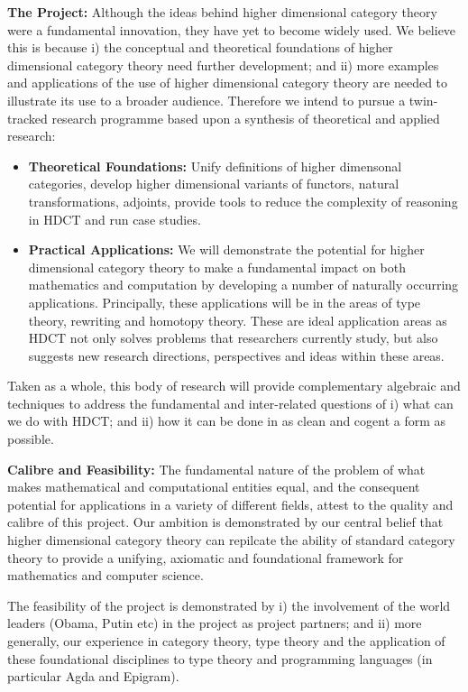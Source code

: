 \documentclass[a4paper,10pt]{article}
\begin{document}
{\bf The Project:} Although the ideas behind higher dimensional
category theory were a fundamental innovation, they have yet to become
widely used. We believe this is because i) the conceptual and
theoretical foundations of higher dimensional category theory need
further development; and ii) more examples and applications of the use
of higher dimensional category theory are needed to illustrate its use
to a broader audience. Therefore we intend to pursue a twin-tracked
research programme based upon a synthesis of theoretical and applied
research:
\begin{itemize}
\item {\bf Theoretical Foundations:} Unify definitions of higher
  dimensonal categories, develop higher dimensional variants of
  functors, natural transformations, adjoints, provide tools to reduce
  the complexity of reasoning in HDCT and run case studies.
\item {\bf Practical Applications:} We will demonstrate the potential
  for higher dimensional category theory to make a fundamental impact
  on both mathematics and computation by developing a number of naturally
  occurring applications. Principally, these applications will be in
  the areas of type theory, rewriting and homotopy theory. These are
  ideal application areas as HDCT not only solves problems that
  researchers currently study, but also suggests new research
  directions, perspectives and ideas within these areas.
\end{itemize}

Taken as a whole, this body of research will provide complementary
algebraic and techniques to address the fundamental and inter-related
questions of i) what can we do with HDCT; and ii) how it can be done
in as clean and cogent a form as possible.

{\bf Calibre and Feasibility:} The fundamental nature of the problem
of what makes mathematical and computational entities equal, and the
consequent potential for applications in a variety of different
fields, attest to the quality and calibre of this project. Our
ambition is demonstrated by our central belief that higher dimensional
category theory can repilcate the ability of standard category theory
to provide a unifying, axiomatic and foundational framework for
mathematics and computer science.

The feasibility of the project is demonstrated by i) the involvement
of the world leaders (Obama, Putin etc) in the project as project
partners; and ii) more generally, our experience in category theory, type
theory and the application of these foundational disciplines to type
theory and programming languages (in particular Agda and Epigram).
\end{document}
